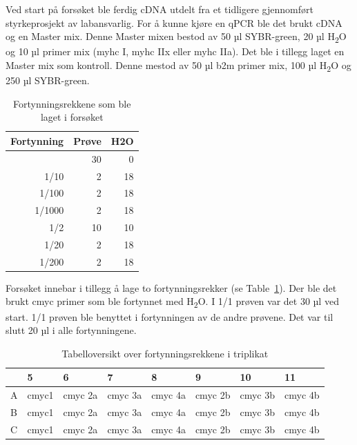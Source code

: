 \documentclass[
  letterpaper,
  DIV=11,
  numbers=noendperiod]{scrreprt}
\begin{document}
Ved start på forsøket ble ferdig cDNA utdelt fra et tidligere
gjennomført styrkeprosjekt av labansvarlig. For å kunne kjøre en qPCR
ble det brukt cDNA og en Master mix. Denne Master mixen bestod av 50 µl
SYBR-green, 20 µl H\textsubscript{2}O og 10 µl primer mix (myhc I, myhc
IIx eller myhc IIa). Det ble i tillegg laget en Master mix som kontroll.
Denne mestod av 50 µl b2m primer mix, 100 µl H\textsubscript{2}O og 250
µl SYBR-green.

\begingroup
\fontsize{12.0pt}{14.4pt}\selectfont

\begin{longtable}{rrr}

\caption{\label{tbl-fortynn}Fortynningsrekkene som ble laget i forsøket}

\tabularnewline

\toprule
Fortynning & Prøve & H2O \\ 
\midrule\addlinespace[2.5pt]
1 & 30 & 0 \\ 
1/10 & 2 & 18 \\ 
1/100 & 2 & 18 \\ 
1/1000 & 2 & 18 \\ 
1/2 & 10 & 10 \\ 
1/20 & 2 & 18 \\ 
1/200 & 2 & 18 \\ 
\bottomrule

\end{longtable}

\endgroup

Forsøket innebar i tillegg å lage to fortynningsrekker (se
Table~\ref{tbl-fortynn}). Der ble det brukt cmyc primer som ble
fortynnet med H\textsubscript{2}O. I 1/1 prøven var det 30 µl ved start.
1/1 prøven ble benyttet i fortynningen av de andre prøvene. Det var til
slutt 20 µl i alle fortynningene.

\begingroup
\fontsize{12.0pt}{14.4pt}\selectfont
\setlength{\LTpost}{0mm}

\begin{longtable}{llllllll}

\caption{\label{tbl-fortynning}Tabelloversikt over fortynningsrekkene i
triplikat}

\tabularnewline

\toprule
 & 5 & 6 & 7 & 8 & 9 & 10 & 11 \\ 
\midrule\addlinespace[2.5pt]
A & cmyc1 & cmyc 2a & cmyc 3a & cmyc 4a & cmyc 2b & cmyc 3b & cmyc 4b \\ 
B & cmyc1 & cmyc 2a & cmyc 3a & cmyc 4a & cmyc 2b & cmyc 3b & cmyc 4b \\ 
C & cmyc1 & cmyc 2a & cmyc 3a & cmyc 4a & cmyc 2b & cmyc 3b & cmyc 4b \\ 
\bottomrule

\end{longtable}
\end{document}
